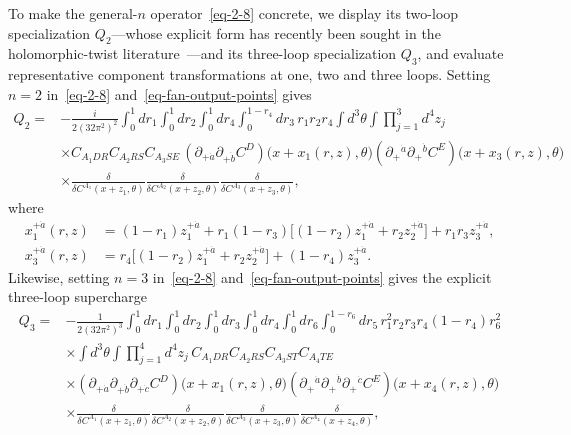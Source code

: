 \documentclass[11pt]{article}
\numberwithin{equation}{section}
\numberwithin{figure}{section}
\numberwithin{table}{section}
\begin{document}
To make the general-$n$ operator~\eqref{eq-2-8} concrete, we display its two-loop specialization $Q_2$---whose explicit form has recently been sought in the holomorphic-twist literature~\cite[Section 3.2.3]{semichiral}---and its three-loop specialization $Q_3$, and evaluate representative component transformations at one, two and three loops. Setting $n=2$ in~\eqref{eq-2-8} and~\eqref{eq-fan-output-points} gives
\begin{equation}\label{eq-2-17}
\begin{aligned}
Q_2={}&-\frac{i}{2(32\pi^2)^2}
\int_0^1dr_1\int_0^1dr_2\int_0^1dr_4
\int_0^{1-r_4}dr_3\,r_1r_2r_4\int d^3\theta\int\prod_{j=1}^{3}d^4z_j\\
&\times C_{A_1DR}C_{A_2RS}C_{A_3SE}\,
(\partial_{+\dot a}\partial_{+\dot b}C^D)
\big(x+x_1(r,z),\theta\big)
(\partial_+{}^{\dot a}\partial_+{}^{\dot b}C^E)
\big(x+x_3(r,z),\theta\big)\\
&\times\frac{\delta}{\delta C^{A_1}(x+z_1,\theta)}
\frac{\delta}{\delta C^{A_2}(x+z_2,\theta)}
\frac{\delta}{\delta C^{A_3}(x+z_3,\theta)},
\end{aligned}
\end{equation}
where
\begin{equation*}
\begin{aligned}
x_1^{+\dot a}(r,z)
&=(1-r_1)z_1^{+\dot a}
+r_1(1-r_3)\big[(1-r_2)z_1^{+\dot a}+r_2z_2^{+\dot a}\big]
+r_1r_3z_3^{+\dot a},\\
x_3^{+\dot a}(r,z)
&=r_4\big[(1-r_2)z_1^{+\dot a}+r_2z_2^{+\dot a}\big]
+(1-r_4)z_3^{+\dot a}.
\end{aligned}
\end{equation*}
Likewise, setting $n=3$ in~\eqref{eq-2-8} and~\eqref{eq-fan-output-points} gives the explicit three-loop supercharge
\begin{equation}\label{eq-Q3-explicit}
\begin{aligned}
Q_3={}&-\frac{1}{2(32\pi^2)^3}
\int_0^1dr_1\int_0^1dr_2\int_0^1dr_3\int_0^1dr_4\int_0^1dr_6
\int_0^{1-r_6}dr_5\,r_1^2r_2r_3r_4(1-r_4)r_6^2\\
&\times\int d^3\theta\int\prod_{j=1}^{4}d^4z_j\,
C_{A_1DR}C_{A_2RS}C_{A_3ST}C_{A_4TE}\\
&\times(\partial_{+\dot a}\partial_{+\dot b}\partial_{+\dot c}C^D)
\big(x+x_1(r,z),\theta\big)
(\partial_+{}^{\dot a}\partial_+{}^{\dot b}\partial_+{}^{\dot c}C^E)
\big(x+x_4(r,z),\theta\big)\\
&\times\frac{\delta}{\delta C^{A_1}(x+z_1,\theta)}
\frac{\delta}{\delta C^{A_2}(x+z_2,\theta)}
\frac{\delta}{\delta C^{A_3}(x+z_3,\theta)}
\frac{\delta}{\delta C^{A_4}(x+z_4,\theta)},
\end{aligned}
\end{equation}
\end{document}
